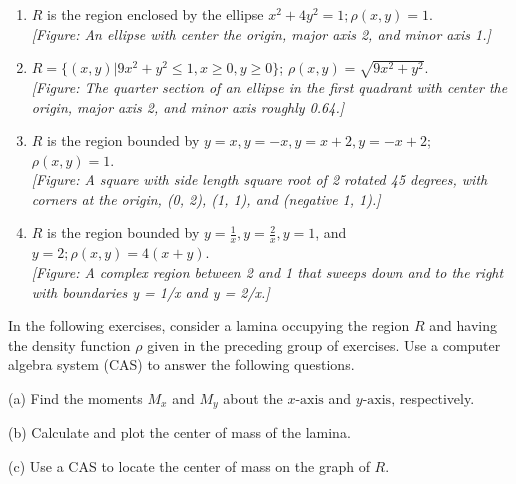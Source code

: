 \documentclass{exercises}
\begin{document}
\begin{enumerate}[start=1]
\item $R$ is the region enclosed by the ellipse $x^{2}+4y^{2}=1;\rho(x,y)=1$. \\ \textit{[Figure: An ellipse with center the origin, major axis 2, and minor axis 1.]}
\item $R=\{(x,y)|9x^{2}+y^{2}\le1,x\ge0,y\ge0\}$; $\rho(x,y)=\sqrt{9x^{2}+y^{2}}$. \\ \textit{[Figure: The quarter section of an ellipse in the first quadrant with center the origin, major axis 2, and minor axis roughly 0.64.]}
\item $R$ is the region bounded by $y=x,y=-x,y=x+2,y=-x+2$; $\rho(x,y)=1$. \\ \textit{[Figure: A square with side length square root of 2 rotated 45 degrees, with corners at the origin, (0, 2), (1, 1), and (negative 1, 1).]}
\item $R$ is the region bounded by $y=\frac{1}{x},y=\frac{2}{x},y=1$, and $y=2;\rho(x,y)=4(x+y)$. \\ \textit{[Figure: A complex region between 2 and 1 that sweeps down and to the right with boundaries y = 1/x and y = 2/x.]}
\end{enumerate}

In the following exercises, consider a lamina occupying the region $R$ and having the density function $\rho$ given in the preceding group of exercises. Use a computer algebra system (CAS) to answer the following questions.


(a) Find the moments $M_{x}$ and $M_{y}$ about the $x\text{-axis}$ and $y\text{-axis,}$ respectively.


(b) Calculate and plot the center of mass of the lamina.


(c) \techrequired Use a CAS to locate the center of mass on the graph of $R$.
\end{document}
